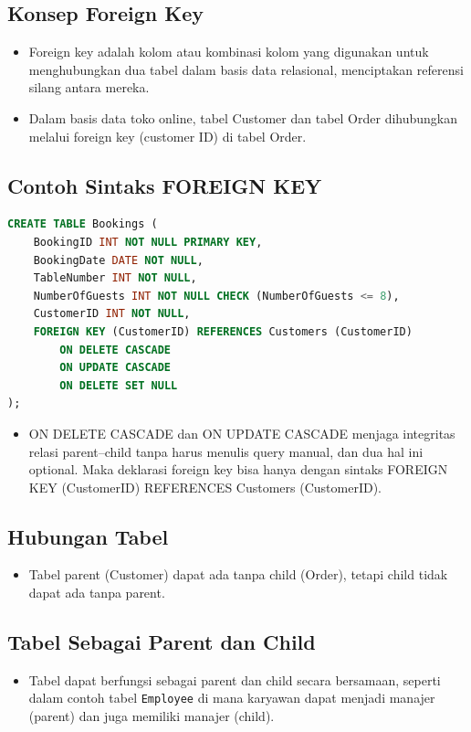 \documentclass{article}
\begin{document}
\subsection{Konsep Foreign Key}
\begin{itemize}
    \item Foreign key adalah kolom atau kombinasi kolom yang digunakan untuk menghubungkan dua tabel dalam basis data relasional, menciptakan referensi silang antara mereka.
    \item Dalam basis data toko online, tabel Customer dan tabel Order dihubungkan melalui foreign key (customer ID) di tabel Order.
\end{itemize}

\subsection{Contoh Sintaks FOREIGN KEY}
\begin{lstlisting}[language=SQL, caption={Contoh syntax Foreign Key}, captionpos=b]
CREATE TABLE Bookings (
    BookingID INT NOT NULL PRIMARY KEY,
    BookingDate DATE NOT NULL, 
    TableNumber INT NOT NULL, 
    NumberOfGuests INT NOT NULL CHECK (NumberOfGuests <= 8), 
    CustomerID INT NOT NULL, 
    FOREIGN KEY (CustomerID) REFERENCES Customers (CustomerID)
        ON DELETE CASCADE 
        ON UPDATE CASCADE
        ON DELETE SET NULL
);
\end{lstlisting}
\begin{itemize}
    \item ON DELETE CASCADE dan ON UPDATE CASCADE menjaga integritas relasi parent–child tanpa harus menulis query manual, dan dua hal ini optional. Maka deklarasi foreign key bisa hanya dengan sintaks FOREIGN KEY (CustomerID) REFERENCES Customers (CustomerID).
\end{itemize}

\subsection{Hubungan Tabel}
\begin{itemize}
    \item Tabel parent (Customer) dapat ada tanpa child (Order), tetapi child tidak dapat ada tanpa parent.
\end{itemize}

\subsection{Tabel Sebagai Parent dan Child}
\begin{itemize}
    \item Tabel dapat berfungsi sebagai parent dan child secara bersamaan, seperti dalam contoh tabel \texttt{Employee} di mana karyawan dapat menjadi manajer (parent) dan juga memiliki manajer (child).
\end{itemize}
\end{document}
